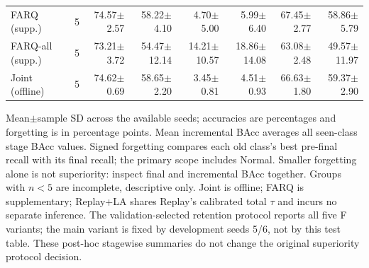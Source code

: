 \begin{table}[t]
\begin{tabular}{lrrrrrrr}
FARQ (supp.) & 5 & 74.57$\pm$2.57 & 58.22$\pm$4.10 & 4.70$\pm$5.00 & 5.99$\pm$6.40 & 67.45$\pm$2.77 & 58.86$\pm$5.79 \\
FARQ-all (supp.) & 5 & 73.21$\pm$3.72 & 54.47$\pm$12.14 & 14.21$\pm$10.57 & 18.86$\pm$14.08 & 63.08$\pm$2.48 & 49.57$\pm$11.97 \\
Joint (offline) & 5 & 74.62$\pm$0.69 & 58.65$\pm$2.20 & 3.45$\pm$0.81 & 4.51$\pm$0.93 & 66.63$\pm$1.80 & 59.37$\pm$2.90 \\
\bottomrule
\end{tabular}
\par\smallskip\begin{minipage}{0.98\textwidth}\scriptsize Mean$\pm$sample SD across the available seeds; accuracies are percentages and forgetting is in percentage points. Mean incremental BAcc averages all seen-class stage BAcc values. Signed forgetting compares each old class's best pre-final recall with its final recall; the primary scope includes Normal. Smaller forgetting alone is not superiority: inspect final and incremental BAcc together. Groups with $n<5$ are incomplete, descriptive only. Joint is offline; FARQ is supplementary; Replay+LA shares Replay's calibrated total $\tau$ and incurs no separate inference. The validation-selected retention protocol reports all five F variants; the main variant is fixed by development seeds 5/6, not by this test table. These post-hoc stagewise summaries do not change the original superiority protocol decision.\end{minipage}
\end{table}

